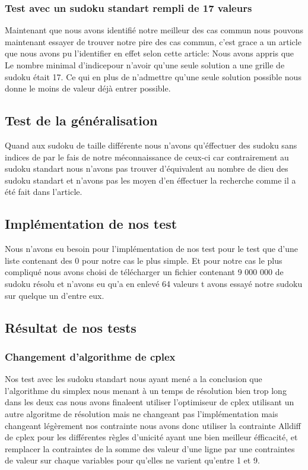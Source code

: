 \subsubsection{Test avec un sudoku standart rempli de 17 valeurs}

Maintenant que nous avons identifié notre meilleur des cas commun nous pouvons maintenant essayer de trouver notre pire des cas commun, c'est grace a un article que nous avons pu l'identifier en effet selon cette article: \cite{NombredeDieu}\newline
Nous avons appris que Le nombre minimal d'indicepour n'avoir qu'une seule solution a une grille de sudoku était 17. Ce qui en plus de n'admettre qu'une seule solution possible nous donne le moins de valeur déjà entrer possible.

\subsection{Test de la généralisation}

Quand aux sudoku de taille différente nous n'avons qu'éffectuer des sudoku sans indices de par le fais de notre méconnaissance de ceux-ci car contrairement au sudoku standart nous n'avons pas trouver d'équivalent au nombre de dieu des sudoku standart et n'avons pas les moyen d'en éffectuer la recherche comme il a été fait dans l'article.

\subsection{Implémentation de nos test}

Nous n'avons eu besoin pour l'implémentation de nos test pour le test que d'une liste contenant des 0 pour notre cas le plus simple. Et pour notre cas le plus compliqué nous avons choisi de télécharger un fichier contenant 9 000 000 de sudoku résolu et n'avons eu qu'a en enlevé 64 valeurs t avons essayé notre sudoku sur quelque un d'entre eux.

\subsection{Résultat de nos tests}

\subsubsection{Changement d'algorithme de cplex}
Nos test avec les sudoku standart nous ayant mené a la conclusion que l'algorithme du simplex nous menant à un temps de résolution bien trop long dans les deux cas nous avons finaleent utiliser l'optimiseur de cplex utilisant un autre algoritme de résolution mais ne changeant pas l'implémentation mais changeant légèrement nos contrainte nous avons donc utiliser la contrainte Alldiff de cplex pour les différentes règles d'unicité ayant une bien meilleur éfficacité, et remplacer la contraintes de la somme des valeur d'une ligne par une contraintes de valeur sur chaque variables pour qu'elles ne varient qu'entre 1 et 9.

